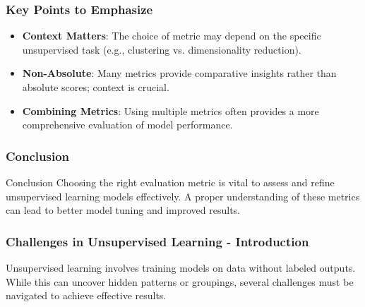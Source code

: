 \documentclass[aspectratio=169]{beamer}
\begin{document}
\begin{frame}[fragile]
    \frametitle{Key Points to Emphasize}
    \begin{itemize}
        \item \textbf{Context Matters}: The choice of metric may depend on the specific unsupervised task (e.g., clustering vs. dimensionality reduction).
        \item \textbf{Non-Absolute}: Many metrics provide comparative insights rather than absolute scores; context is crucial.
        \item \textbf{Combining Metrics}: Using multiple metrics often provides a more comprehensive evaluation of model performance.
    \end{itemize}
\end{frame}

\begin{frame}[fragile]
    \frametitle{Conclusion}
    \begin{block}{Conclusion}
        Choosing the right evaluation metric is vital to assess and refine unsupervised learning models effectively. A proper understanding of these metrics can lead to better model tuning and improved results.
    \end{block}
\end{frame}

\begin{frame}[fragile]
    \frametitle{Challenges in Unsupervised Learning - Introduction}
    Unsupervised learning involves training models on data without labeled outputs. While this can uncover hidden patterns or groupings, several challenges must be navigated to achieve effective results.
\end{frame}
\end{document}

